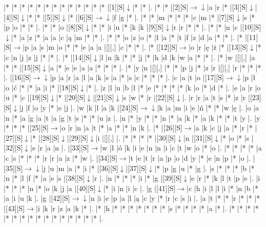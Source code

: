\documentclass[11pt]{article}
\newcommand\drarr{$\rightarrow \!\!\!\!\! \downarrow$}
\newcommand\rarr{$\rightarrow$}
\newcommand\darr{$\downarrow$}
\begin{document}
\noindent\begin{Puzzle}{15}{33}|*	|*	|*	|*	|*	|*	|*	|*	|*	|*	|*	|*	|*	|[1][S]\darr	|*	|*	|.
|*	|*	|[2][S]\drarr	|a	|r	|*	|[3][S]\darr	|[4][S]\darr	|*	|*	|[5][S]\darr	|*	|[6][S]\drarr	|f	|g	|*	|.
|*	|*	|m	|*	|*	|*	|c	|m	|*	|[7][S]\darr	|s	|*	|p	|o	|*	|*	|.
|*	|*	|o	|[8][S]\darr	|*	|*	|i	|u	|*	|k	|k	|[9][S]\darr	|r	|r	|*	|*	|.
|*	|*	|n	|c	|[10][S]\darr	|*	|a	|z	|*	|a	|a	|c	|ą	|m	|*	|*	|.
|*	|*	|o	|z	|o	|*	|ł	|a	|*	|t	|f	|z	|d	|a	|*	|*	|.
|*	|[11][S]\rarr	|p	|a	|s	|m	|o	|*	|*	|e	|a	|a	|[][,]{ }	|c	|*	|*	|.
|*	|[12][S]\rarr	|o	|r	|ę	|ż	|*	|[13][S]\darr	|*	|c	|n	|j	|z	|j	|*	|*	|.
|*	|[14][S]\darr	|l	|n	|k	|*	|*	|j	|*	|h	|d	|k	|w	|a	|*	|*	|.
|*	|w	|[][,]{ }	|a	|*	|*	|[15][S]\darr	|a	|*	|e	|e	|a	|a	|*	|*	|*	|.
|*	|y	|n	|[][,]{ }	|*	|*	|p	|j	|*	|z	|r	|[][,]{ }	|r	|*	|*	|*	|.
|[16][S]\drarr	|p	|a	|r	|a	|l	|a	|k	|s	|a	|*	|s	|c	|*	|*	|*	|.
|c	|a	|t	|o	|[17][S]\drarr	|p	|ł	|o	|ć	|*	|*	|a	|i	|*	|[18][S]\darr	|*	|.
|z	|l	|u	|b	|ł	|*	|e	|*	|*	|*	|*	|k	|o	|*	|d	|*	|.
|e	|a	|r	|o	|u	|*	|c	|[19][S]\darr	|*	|[20][S]\darr	|[21][S]\darr	|s	|w	|*	|r	|[22][S]\darr	|.
|r	|r	|a	|t	|s	|*	|z	|r	|[23][S]\darr	|j	|f	|o	|y	|*	|e	|j	|.
|w	|k	|l	|a	|k	|[24][S]\drarr	|k	|a	|m	|i	|e	|ń	|*	|*	|w	|ę	|.
|o	|a	|n	|*	|a	|g	|a	|t	|a	|g	|t	|s	|*	|*	|u	|z	|.
|n	|*	|y	|*	|*	|n	|*	|a	|k	|*	|a	|k	|*	|*	|t	|y	|.
|y	|*	|*	|*	|[25][S]\rarr	|o	|r	|n	|a	|t	|*	|a	|*	|*	|n	|k	|.
|*	|[26][S]\rarr	|a	|k	|c	|j	|a	|*	|r	|*	|[27][S]\darr	|*	|[28][S]\darr	|[29][S]\darr	|i	|[][,]{ }	|.
|*	|*	|*	|*	|[30][S]\darr	|n	|[31][S]\darr	|*	|o	|*	|s	|[32][S]\darr	|e	|r	|a	|n	|.
|[33][S]\rarr	|w	|ł	|ó	|k	|i	|e	|n	|n	|i	|c	|t	|w	|o	|*	|o	|.
|*	|*	|*	|*	|a	|c	|s	|*	|*	|*	|r	|r	|a	|z	|*	|w	|.
|[34][S]\rarr	|t	|e	|t	|r	|a	|p	|o	|d	|y	|*	|e	|n	|p	|*	|o	|.
|[35][S]\drarr	|j	|u	|m	|a	|*	|i	|*	|[36][S]\darr	|[37][S]\darr	|*	|p	|g	|u	|*	|g	|.
|s	|*	|*	|*	|b	|*	|n	|*	|l	|f	|*	|a	|e	|s	|[38][S]\darr	|r	|.
|n	|*	|*	|*	|i	|*	|g	|[39][S]\darr	|e	|r	|*	|k	|l	|t	|p	|e	|.
|i	|*	|*	|*	|n	|*	|o	|k	|j	|a	|[40][S]\darr	|*	|i	|n	|i	|c	|.
|g	|[41][S]\rarr	|c	|h	|i	|l	|l	|i	|*	|n	|b	|*	|a	|i	|u	|k	|.
|g	|[42][S]\drarr	|n	|i	|e	|p	|a	|l	|ą	|c	|y	|*	|r	|c	|s	|i	|.
|a	|t	|*	|*	|r	|*	|*	|*	|[43][S]\rarr	|i	|k	|r	|z	|a	|k	|*	|.
|*	|h	|*	|*	|*	|*	|*	|*	|*	|s	|*	|*	|*	|*	|a	|*	|.
|*	|*	|*	|*	|*	|*	|*	|*	|*	|*	|*	|*	|*	|*	|*	|*	|.\end{Puzzle}

\newpage
\end{document}
